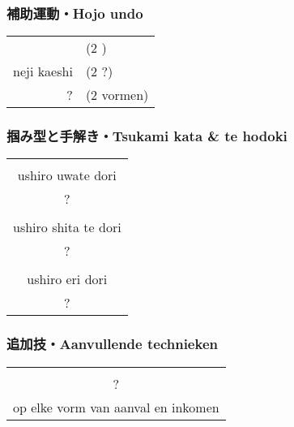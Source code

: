 \subsubsection{補助運動・Hojo undo}
\begin{table}[H]
\begin{center}
\begin{tabular}{rl}
    \ruby{}{}\ruby{}{} & (2 \ruby{}{})\\
    neji kaeshi & (2 ?)\\
    ? & (2 vormen)
\end{tabular}
\end{center}
\label{kyuu_3_hojo_undo}
\end{table}

\subsubsection{掴み型と手解き・Tsukami kata \& te hodoki}
\begin{table}[H]
\begin{center}
\begin{tabular}{c}
    \ruby{}{}\ruby{}{}\\
    ushiro uwate dori\\
    ?\\
    \hline
    \ruby{}{}\\
    ushiro shita te dori\\
    ?\\
    \hline
    \ruby{}{}\\
    ushiro eri dori\\
    ?
\end{tabular}
\end{center}
\label{kyuu_3_te_hodoki}
\end{table}

\subsubsection{追加技・Aanvullende technieken}
\begin{table}[H]
\begin{center}
\begin{tabular}{c}
    \ruby{}{}\\
    ?\\
    op elke vorm van aanval en inkomen
\end{tabular}
\end{center}
\label{kyuu_3_additional}
\end{table}

